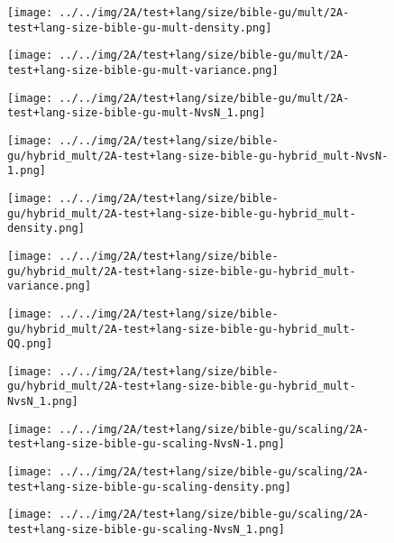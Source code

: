 \begin{figure}[H]
\centering	\texttt{[image: ../../img/2A/test+lang/size/bible-gu/mult/2A-test+lang-size-bible-gu-mult-density.png]}
\end{figure}
\begin{figure}[H]
\centering	\texttt{[image: ../../img/2A/test+lang/size/bible-gu/mult/2A-test+lang-size-bible-gu-mult-variance.png]}
\end{figure}
\begin{figure}[H]
\centering	\texttt{[image: ../../img/2A/test+lang/size/bible-gu/mult/2A-test+lang-size-bible-gu-mult-NvsN\_1.png]}
\end{figure}
\begin{figure}[H]
\centering	\texttt{[image: ../../img/2A/test+lang/size/bible-gu/hybrid\_mult/2A-test+lang-size-bible-gu-hybrid\_mult-NvsN-1.png]}
\end{figure}
\begin{figure}[H]
\centering	\texttt{[image: ../../img/2A/test+lang/size/bible-gu/hybrid\_mult/2A-test+lang-size-bible-gu-hybrid\_mult-density.png]}
\end{figure}
\begin{figure}[H]
\centering	\texttt{[image: ../../img/2A/test+lang/size/bible-gu/hybrid\_mult/2A-test+lang-size-bible-gu-hybrid\_mult-variance.png]}
\end{figure}
\begin{figure}[H]
\centering	\texttt{[image: ../../img/2A/test+lang/size/bible-gu/hybrid\_mult/2A-test+lang-size-bible-gu-hybrid\_mult-QQ.png]}
\end{figure}
\begin{figure}[H]
\centering	\texttt{[image: ../../img/2A/test+lang/size/bible-gu/hybrid\_mult/2A-test+lang-size-bible-gu-hybrid\_mult-NvsN\_1.png]}
\end{figure}
\begin{figure}[H]
\centering	\texttt{[image: ../../img/2A/test+lang/size/bible-gu/scaling/2A-test+lang-size-bible-gu-scaling-NvsN-1.png]}
\end{figure}
\begin{figure}[H]
\centering	\texttt{[image: ../../img/2A/test+lang/size/bible-gu/scaling/2A-test+lang-size-bible-gu-scaling-density.png]}
\end{figure}
\begin{figure}[H]
\centering	\texttt{[image: ../../img/2A/test+lang/size/bible-gu/scaling/2A-test+lang-size-bible-gu-scaling-NvsN\_1.png]}
\end{figure}
